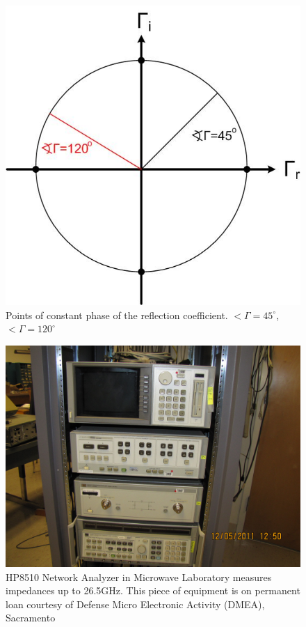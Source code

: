 \documentclass{ximera}
\begin{document}
\begin{figure}[htbp]
\begin{center}
\includegraphics[scale=0.3]{../jpg/smithchartangle.jpg}
\end{center}
\caption{Points of constant phase of the reflection coefficient. $ < \Gamma =45^\circ$, $  <  \Gamma = 120^\circ$}
\label{scswr}
\end{figure}






\begin{figure}[htbp]
\begin{center}
\includegraphics[scale=0.2]{../jpg/HP8510.jpg}
\end{center}
\caption{HP8510 Network Analyzer in Microwave Laboratory measures impedances up to 26.5GHz. This piece of equipment is on permanent loan courtesy of Defense Micro Electronic Activity (DMEA), Sacramento}
\label{hp8510}
\end{figure}
\end{document}
